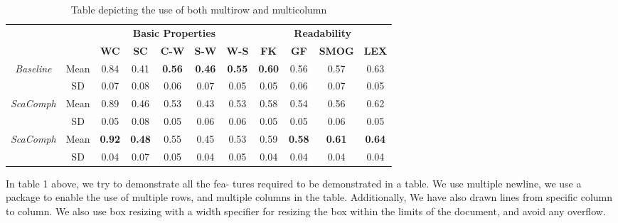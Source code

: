 \documentclass[a4paper, 12pt, fullpage]{article}
\begin{document}
\begin{table}[h!]
\begin{adjustbox}{max width=\textwidth}
\begin{tabular}{|cc|c|c|c|c|c|c|c|c|c|c|}
	\cline{4-12}
	\multicolumn{3}{c|}{\multirow{2}{*}{}} & \multicolumn{5}{c}{\textbf{Basic Properties}} & \multicolumn{4}{|c|}{\textbf{Readability}} \\
	\cline{4-12}
	\multicolumn{3}{c|}{} & \textbf{WC} & \textbf{SC} & \textbf{C-W} & \textbf{S-W} & \textbf{W-S} & \textbf{FK} & \textbf{GF} & \textbf{SMOG} & \textbf{LEX} \\
	\hline
	\multicolumn{2}{|c|}{\multirow{2}{*}{\textit{Baseline}}} & Mean & 0.84 & 0.41 & \textbf{0.56} & \textbf{0.46} & \textbf{0.55} & \textbf{0.60} & 0.56 & 0.57 & 0.63 \\
	\cline{3-12}
	\multicolumn{2}{|c|}{} & SD & 0.07 & 0.08 & 0.06 & 0.07 & 0.05 & 0.05 & 0.06 & 0.07 & 0.05 \\
	\hline
	\hline
	\multicolumn{2}{|c|}{\multirow{2}{*}{\textit{ScaComph}}} & Mean & 0.89 & 0.46 & 0.53 & 0.43 & 0.53 & 0.58 & 0.54 & 0.56 & 0.62 \\
	\cline{3-12}
	\multicolumn{2}{|c|}{} & SD & 0.05 & 0.08 & 0.05 & 0.06 & 0.06 & 0.05 & 0.05 & 0.06 & 0.05 \\
	\hline
	\hline
	\multicolumn{2}{|c|}{\multirow{2}{*}{\textit{ScaComph}}} & Mean & \textbf{0.92} & \textbf{0.48} & 0.55 & 0.45 & 0.53 & 0.59 & \textbf{0.58} & \textbf{0.61} & \textbf{0.64} \\
	\cline{3-12}
	\multicolumn{2}{|c|}{} & SD & 0.04 & 0.07 & 0.05 & 0.04 & 0.05 & 0.04 & 0.04 & 0.04 & 0.04 \\
	\hline
	
\end{tabular}
\end{adjustbox}

\caption {Table depicting the use of both multirow and multicolumn}


\end{table}

{\Large In table 1 above, we try to demonstrate all the fea-
tures required to be demonstrated in a table. We use
multiple newline, we use a package to enable the use
of multiple rows, and multiple columns in the table.
Additionally, We have also drawn lines from specific
column to column. We also use box resizing with a
width specifier for resizing the box within the limits of
the document, and avoid any overflow.}
\end{document}
